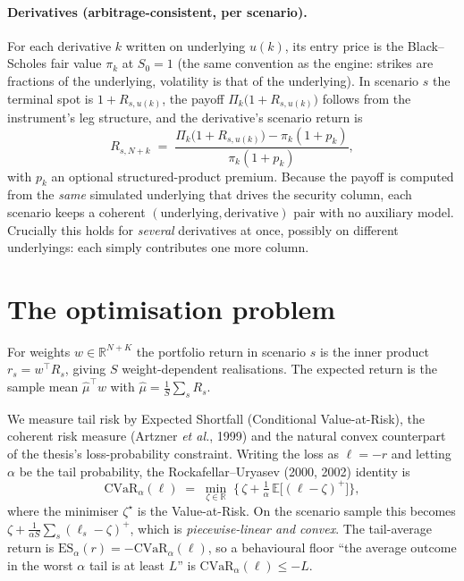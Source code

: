 \documentclass[11pt]{article}
\newcommand{\R}{\mathbb{R}}
\newcommand{\E}{\mathbb{E}}
\newcommand{\T}{^{\!\top}}
\begin{document}
\paragraph{Derivatives (arbitrage-consistent, per scenario).}
For each derivative $k$ written on underlying $u(k)$, its entry price is the
Black--Scholes fair value $\pi_k$ at $S_0=1$ (the same convention as the engine:
strikes are fractions of the underlying, volatility is that of the underlying).
In scenario $s$ the terminal spot is $1+R_{s,u(k)}$, the payoff
$\Pi_k\!\big(1+R_{s,u(k)}\big)$ follows from the instrument's leg structure, and the
derivative's scenario return is
\[
   R_{s,N+k} \;=\; \frac{\Pi_k\!\big(1+R_{s,u(k)}\big) - \pi_k(1+p_k)}{\pi_k(1+p_k)},
\]
with $p_k$ an optional structured-product premium. Because the payoff is computed
from the \emph{same} simulated underlying that drives the security column, each
scenario keeps a coherent $(\text{underlying},\text{derivative})$ pair with no
auxiliary model. Crucially this holds for \emph{several} derivatives at once,
possibly on different underlyings: each simply contributes one more column.

\section{The optimisation problem}
For weights $w\in\R^{N+K}$ the portfolio return in scenario $s$ is the inner
product $r_s = w\T R_s$, giving $S$ weight-dependent realisations. The expected
return is the sample mean $\widehat\mu\T w$ with $\widehat\mu = \tfrac1S\sum_s R_s$.

We measure tail risk by Expected Shortfall (Conditional Value-at-Risk), the
coherent risk measure (Artzner \emph{et al.}, 1999) and the natural convex
counterpart of the thesis's loss-probability constraint. Writing the loss as
$\ell = -r$ and letting $\alpha$ be the tail probability, the
Rockafellar--Uryasev (2000, 2002) identity is
\[
   \mathrm{CVaR}_\alpha(\ell)
   \;=\; \min_{\zeta\in\R}\;\Big\{\, \zeta + \tfrac{1}{\alpha}\,
   \E\big[(\ell-\zeta)^{+}\big] \Big\},
\]
where the minimiser $\zeta^\star$ is the Value-at-Risk. On the scenario sample this
becomes $\zeta + \tfrac{1}{\alpha S}\sum_s(\ell_s-\zeta)^{+}$, which is
\emph{piecewise-linear and convex}. The tail-average return is
$\mathrm{ES}_\alpha(r) = -\mathrm{CVaR}_\alpha(\ell)$, so a behavioural floor
``the average outcome in the worst $\alpha$ tail is at least $L$'' is
$\mathrm{CVaR}_\alpha(\ell)\le -L$.
\end{document}
